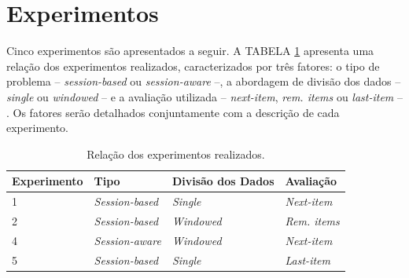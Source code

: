   \newpage
  \section{Experimentos}

  Cinco experimentos são apresentados a seguir. A TABELA
  \ref{tab:experiments_done} apresenta uma relação dos experimentos realizados,
  caracterizados por três fatores: o tipo de problema -- \textit{session-based}
  ou \textit{session-aware} --, a abordagem de divisão dos dados --
  \textit{single} ou \textit{windowed} -- e a avaliação utilizada --
  \textit{next-item}, \textit{rem. items} ou \textit{last-item} -- . Os fatores
  serão detalhados conjuntamente com a descrição de cada experimento.


\begin{table}
 \centering
 \begin{tabular}{|l|l|l|l|}
   \hline
   \textbf{Experimento} & \textbf{Tipo} & \textbf{Divisão dos Dados} & \textbf{Avaliação} \\ \hline 
   1 &\textit{Session-based} & \textit{Single} & \textit{Next-item}\\ \hline
   2 & \textit{Session-based} & \textit{Windowed} & \textit{Rem. items} \\ \hline
   4 & \textit{Session-aware} & \textit{Windowed} & \textit{Next-item}\\ \hline
   5 & \textit{Session-based} & \textit{Single} & \textit{Last-item}\\ \hline
 \end{tabular}
 \caption{Relação dos experimentos realizados.}
 \label{tab:experiments_done}
\end{table}



